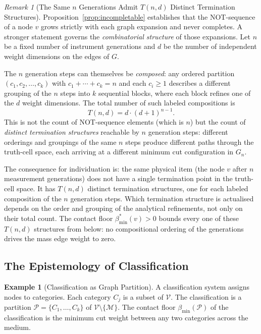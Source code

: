 \documentclass[11pt,twocolumn,a4paper]{article}
\theoremstyle{plain}
\theoremstyle{definition}
\newtheorem{example}[theorem]{Example}
\theoremstyle{remark}
\newtheorem{remark}[theorem]{Remark}
\newcommand{\med}{\mathcal{M}}
\newcommand{\Pcal}{\mathcal{P}}
\newcommand{\Vcal}{\mathcal{V}}
\newcommand{\bmin}{\beta_{\min}}
\begin{document}
\begin{remark}[The Same $n$ Generations Admit $T(n,d)$ Distinct Termination Structures]
\label{rem:composition_inflation}
Proposition~\ref{prop:incompletable} establishes that the NOT-sequence of a
node $v$ grows strictly with each graph expansion and never completes. A
stronger statement governs the \emph{combinatorial structure} of those
expansions. Let $n$ be a fixed number of instrument generations and $d$ be
the number of independent weight dimensions on the edges of $G$.

The $n$ generation steps can themselves be \emph{composed}: any ordered
partition $(c_1, c_2, \ldots, c_k)$ with $c_1 + \cdots + c_k = n$ and each
$c_i \geq 1$ describes a different grouping of the $n$ steps into $k$
sequential blocks, where each block refines one of the $d$ weight dimensions.
The total number of such labeled compositions is
\[
  T(n, d) = d \cdot (d+1)^{n-1}.
\]
This is not the count of NOT-sequence elements (which is $n$) but the count
of \emph{distinct termination structures} reachable by $n$ generation steps:
different orderings and groupings of the same $n$ steps produce different
paths through the truth-cell space, each arriving at a different minimum cut
configuration in $G_n$.

The consequence for individuation is: the same physical item (the node $v$
after $n$ measurement generations) does not have a single termination point
in the truth-cell space. It has $T(n, d)$ distinct termination structures,
one for each labeled composition of the $n$ generation steps. Which
termination structure is actualised depends on the order and grouping of the
analytical refinements, not only on their total count. The contact floor
$\bmin^*(v) > 0$ bounds every one of these $T(n,d)$ structures from below:
no compositional ordering of the generations drives the mass edge weight to
zero.
\end{remark}

\subsection{The Epistemology of Classification}

\begin{example}[Classification as Graph Partition]
\label{ex:classification}
A classification system assigns nodes to categories. Each category $C_j$
is a subset of $\Vcal$. The classification is a partition $\Pcal =
\{C_1, \ldots, C_k\}$ of $\Vcal \setminus \{\med\}$. The contact floor
$\bmin(\Pcal)$ of the classification is the minimum cut weight between any
two categories across the medium.
\end{example}
\end{document}
